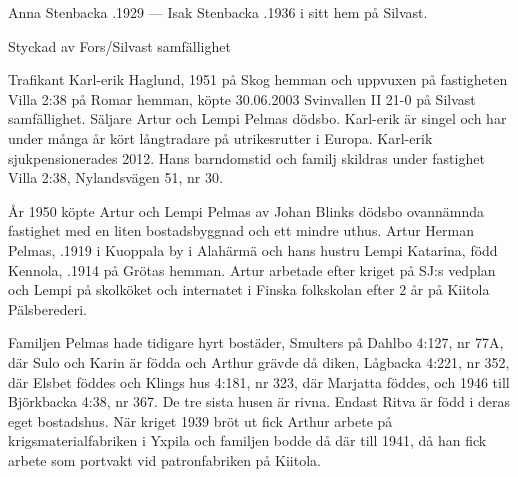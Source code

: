 Anna Stenbacka .1929  ---  Isak Stenbacka .1936 i sitt hem på Silvast.



%

Styckad av Fors/Silvast samfällighet


%
Trafikant Karl-erik Haglund,  1951 på Skog hemman och uppvuxen på fastigheten Villa 2:38 på Romar hemman, köpte 30.06.2003 Svinvallen II 21-0 på Silvast samfällighet. Säljare Artur och Lempi Pelmas dödsbo. Karl-erik är singel och har under många år kört långtradare på utrikesrutter i Europa. Karl-erik sjukpensionerades 2012. Hans barndomstid och familj skildras under fastighet Villa 2:38, Nylandsvägen 51, nr 30.


%
År 1950 köpte Artur och Lempi Pelmas av Johan Blinks dödsbo ovannämnda fastighet med en liten bostadsbyggnad och ett mindre uthus. Artur Herman Pelmas, .1919 i Kuoppala by i Alahärmä och hans hustru Lempi Katarina, född Kennola, .1914 på Grötas hemman. Artur arbetade efter kriget på SJ:s vedplan och Lempi på skolköket och internatet i Finska folkskolan efter 2 år på Kiitola 	Pälsberederi.
\begin{jhchildren}
  \item {}
  \item {}
  \item {}
  \item {}
  \item {}
\end{jhchildren}
Familjen Pelmas hade tidigare hyrt bostäder, Smulters på Dahlbo 4:127, nr 77A, där Sulo och Karin är födda och Arthur grävde då diken, Lågbacka 4:221, nr 352, där Elsbet föddes och Klings hus 4:181, nr 323, där Marjatta föddes, och 1946 till Björkbacka 4:38, nr 367. De tre sista husen är rivna. Endast Ritva är född i deras eget bostadshus. När kriget 1939 bröt ut fick Arthur arbete på krigsmaterialfabriken i Yxpila och familjen bodde då där till 1941, då han fick arbete som portvakt vid patronfabriken på Kiitola.

